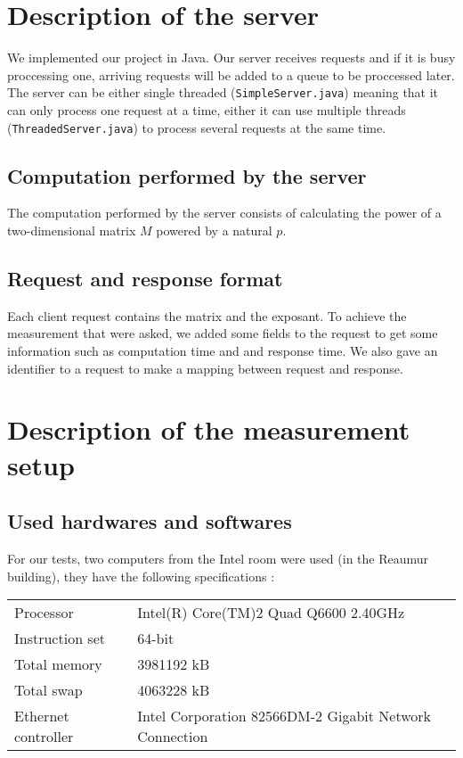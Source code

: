 \section{Description of the server}
\label{sec:Description of the server}

We implemented our project in Java. Our server receives requests and if it is busy proccessing one,
arriving requests will be added to a queue to be proccessed later. The server can be either
single threaded (\verb#SimpleServer.java#) meaning that it can only process one request at a time, either it can use multiple threads (\verb#ThreadedServer.java#) to process several requests at the same time.

\subsection{Computation performed by the server}
\label{sub:Computation performed by the server}

The computation performed by the server consists of calculating the power of a
two-dimensional matrix $M$ powered by a natural $p$.

\subsection{Request and response format}
\label{sub:Request and response format}

Each client request contains the matrix and the exposant. To achieve the
measurement that were asked, we added some fields to the request to get
some information such as computation time and and response time. We also
gave an identifier to a request to make a mapping between request and response.

\section{Description of the measurement setup}
\label{sec:Description of the measurement setup}

\subsection{Used hardwares and softwares}
\label{sub:Used hardwares and softwares}

For our tests, two computers from the Intel room were used (in the Reaumur
building), they have the following specifications :

\begin{tabular}{|l|l|}
    \hline
    Processor & Intel(R) Core(TM)2 Quad Q6600 \@ 2.40GHz \\
    Instruction set & 64-bit \\
    \hline
    Total memory & 3981192 kB \\
    Total swap & 4063228 kB \\
    \hline
    Ethernet controller & Intel Corporation 82566DM-2 Gigabit Network Connection \\
    \hline
\end{tabular}
\bigskip

